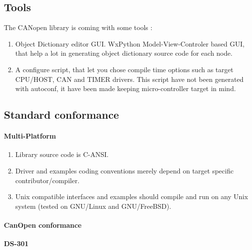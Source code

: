 \documentclass[12pt,twoside]{article}
\newcommand\liststyleLii{%
\renewcommand\labelitemi{{--}}
\renewcommand\labelitemii{{--}}
\renewcommand\labelitemiii{{--}}
\renewcommand\labelitemiv{{--}}
}
\newcommand\liststyleLiii{%
\renewcommand\labelitemi{{--}}
\renewcommand\labelitemii{{--}}
\renewcommand\labelitemiii{{--}}
\renewcommand\labelitemiv{{--}}
}
\begin{document}
\subsection{Tools }
The CANopen library is coming with some tools :

\liststyleLii
\begin{enumerate}
\item Object Dictionary editor GUI. WxPython Model{}-View{}-Controler
based GUI, that help a lot in generating object dictionary source code
for each node.
\item A configure script, that let you chose compile time options such
as target CPU/HOST, CAN and TIMER drivers.\newline
This script have not been generated with autoconf, it have been made
keeping micro{}-controller target in mind.
\end{enumerate}
\subsection{Standard conformance}
\paragraph{Multi{}-Platform}
\liststyleLiii
\begin{enumerate}
\item Library source code is C{}-ANSI.
\item Driver and examples coding conventions merely depend on target
specific contributor/compiler.
\item Unix compatible interfaces and examples should compile and run on
any Unix system (tested on GNU/Linux and GNU/FreeBSD).
\end{enumerate}
\paragraph{CanOpen conformance}
{\bfseries\upshape
DS{}-301}
\end{document}
